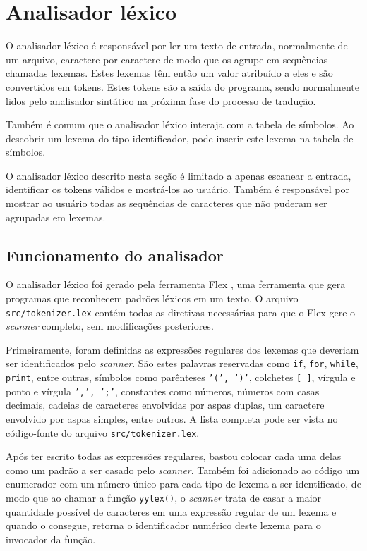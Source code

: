 \documentclass[
	article,			%
	11pt,				%
	oneside,			%
	a4paper,			%
	english,			%
	brazil,				%
	sumario=tradicional
	]{abntex2}
\begin{document}
% 

\section{Analisador léxico}


O analisador léxico é responsável por ler um texto de entrada,
normalmente de um arquivo, caractere por caractere de modo que
os agrupe em sequências chamadas lexemas. Estes lexemas têm
então um valor atribuído a eles e são convertidos em tokens. 
Estes tokens são a saída do programa, sendo normalmente lidos
pelo analisador sintático na próxima fase do processo de tradução.

Também é comum que o analisador léxico interaja com a tabela de
símbolos. Ao descobrir um lexema do tipo identificador, pode inserir
este lexema na tabela de símbolos.

O analisador léxico descrito nesta seção é limitado a apenas
escanear a entrada, identificar os tokens válidos e mostrá-los ao
usuário. Também é responsável por mostrar ao usuário todas as 
sequências de caracteres que não puderam ser agrupadas em lexemas. 


\subsection{Funcionamento do analisador}

O analisador léxico foi gerado pela ferramenta Flex
\cite{westes:flex}, uma ferramenta que gera programas que
reconhecem padrões léxicos em um texto. O arquivo
\texttt{src/tokenizer.lex} \cite{unb-translator-mikael} contém
todas as diretivas necessárias para que o Flex gere o \textit{scanner}
completo, sem modificações posteriores. 

Primeiramente, foram definidas as expressões regulares dos lexemas
que deveriam ser identificados pelo \textit{scanner}. São estes palavras
reservadas como \texttt{if}, \texttt{for}, \texttt{while},
\texttt{print}, entre outras, símbolos como parênteses
\texttt{'(', ')'}, colchetes \texttt{[ ]}, vírgula e ponto e
vírgula \texttt{',', ';'}, constantes como números, números com
casas decimais, cadeias de caracteres envolvidas por aspas duplas,
um caractere envolvido por aspas simples, entre outros. A lista
completa pode ser vista no código-fonte do arquivo
\texttt{src/tokenizer.lex}.

Após ter escrito todas as expressões regulares, bastou colocar
cada uma delas como um padrão a ser casado pelo \textit{scanner}.
Também foi adicionado ao código um enumerador com um número único
para cada tipo de lexema a ser identificado, de modo que ao chamar
a função \texttt{yylex()}, o \textit{scanner} trata de casar a maior
quantidade possível de caracteres em uma expressão regular de um
lexema e quando o consegue, retorna o identificador numérico deste
lexema para o invocador da função.
\end{document}
